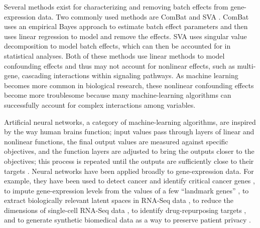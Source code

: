 \documentclass[11pt]{article}
\begin{document}
Several methods exist for characterizing and removing batch effects from gene-expression data.
Two commonly used methods are ComBat \citep{johnson_adjusting_2007} and SVA \citep{leek_capturing_2007}.
ComBat uses an empirical Bayes approach to estimate batch effect parameters and then uses linear regression to model and remove the effects. SVA uses singular value decomposition to model batch effects, which can then be accounted for in statistical analyses.
Both of these methods use linear methods to model confounding effects and thus may not account for nonlinear effects, such as multi-gene, cascading interactions within signaling pathways.
As machine learning becomes more common in biological research, these nonlinear confounding effects become more troublesome because many machine-learning algorithms can successfully account for complex interactions among variables.

Artificial neural networks, a category of machine-learning algorithms, are inspired by the way human brains function; input values pass through layers of linear and nonlinear functions, the final output values are measured against specific objectives, and the function layers are adjusted to bring the outputs closer to the objectives; this process is repeated until the outputs are sufficiently close to their targets \citep{schmidhuber_deep_2015}.
Neural networks have been applied broadly to gene-expression data. For example, they have been used to detect cancer and identify critical cancer genes \citep{danaee_deep_2016}, to impute gene-expression levels from the values of a few ``landmark genes'' \citep{chen_gene_2016}, to extract biologically relevant latent spaces in RNA-Seq data \citep{way_extracting_2017}, to reduce the dimensions of single-cell RNA-Seq data \citep{lin_using_2017}, to identify drug-repurposing targets \citep{aliper_deep_2016}, and to generate synthetic biomedical data as a way to preserve patient privacy \citep{beaulieu-jones_privacy-preserving_2017}.
\end{document}
